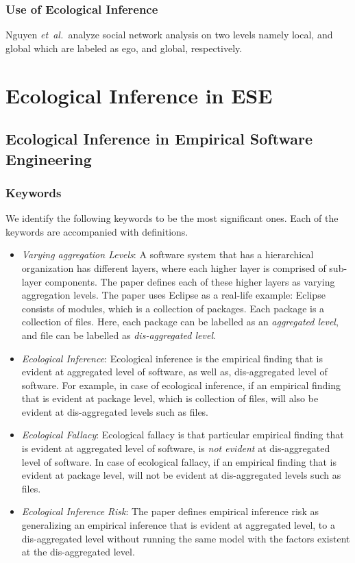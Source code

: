 \documentclass{sig-alternate-05-2015}
\newcommand{\etal}{\mbox{\emph{et al.\ }}}
\begin{document}
\subsubsection{Use of Ecological Inference}
Nguyen \etal analyze social network analysis on two levels namely local, and global which are labeled as ego, and global, respectively.


\section{Ecological Inference in ESE}
\subsection{Ecological Inference in Empirical Software Engineering \cite{Posnett:2011}}
\subsubsection{Keywords}
We identify the following keywords to be the most significant ones.  Each of the keywords 
are accompanied with definitions. 

\begin{itemize}
\item \emph{Varying aggregation Levels}:
A software system that has a hierarchical organization has different layers, where
each higher layer is comprised of sub-layer components.  The paper defines 
each of these higher layers as varying aggregation levels. The paper uses Eclipse as a real-life
example: Eclipse consists of modules, which is a collection of packages. Each package 
is a collection of files. Here, each package can be labelled as an \textit{aggregated level}, and file can be labelled as  \textit{dis-aggregated level}.   
\item  \emph{Ecological Inference}:
Ecological inference is the empirical finding that is evident at aggregated level of 
software, as well as, dis-aggregated level of software. For example, in case of ecological inference, if an empirical finding that is evident at package level, which is collection of
files, will also be evident at dis-aggregated levels such as files. 
\item \emph{Ecological Fallacy}: 
Ecological fallacy is that particular empirical finding that is evident at aggregated level of software, is \textit{not evident} at dis-aggregated level of software. In case of ecological fallacy, if an empirical finding that is evident at package level, will not be evident at dis-aggregated levels such as files. 
\item \emph{ Ecological Inference Risk}:
The paper defines empirical inference risk as generalizing an empirical inference that is 
evident at aggregated level, to a dis-aggregated level without running 
the same model with the factors existent at the dis-aggregated level. 
\end{itemize}
\end{document}

